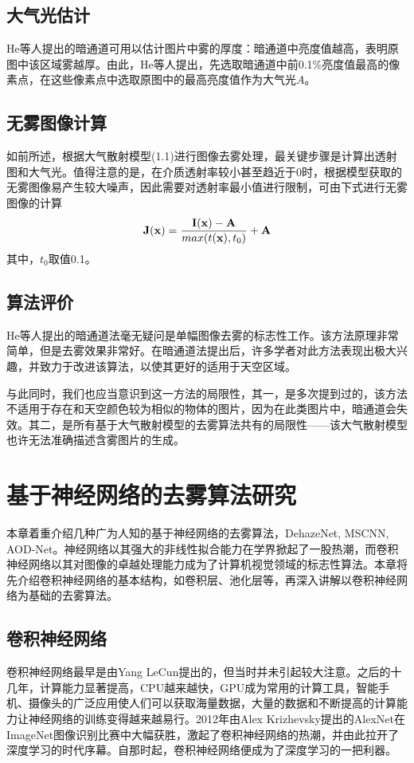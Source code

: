 \documentclass[a4paper, 12pt, oneside]{report}
\begin{document}
{\section{大气光估计\quad}
He等人提出的{\Large 暗通道可用以估计图片中雾的厚度}：暗通道中亮度值越高，表明原图中该区域雾越厚。由此，He等人提出，先选取暗通道中前0.1\%亮度值最高的像素点，在这些像素点中选取原图中的最高亮度值作为大气光$A$。

\section{无雾图像计算\quad}
如前所述，根据大气散射模型(1.1)进行图像去雾处理，最关键步骤是计算出透射图和大气光。值得注意的是，在介质透射率较小甚至趋近于0时，根据模型获取的无雾图像易产生较大噪声，因此需要对透射率最小值进行限制，可由下式进行无雾图像的计算
\begin{equation}
{\bf J(x)} = \frac{\bf I(x) - A}{max(t({\bf x}), t_0)} + {\bf A}
\end{equation}
其中，$t_0$取值0.1。

\section{算法评价\quad}
He等人提出的暗通道法毫无疑问是单幅图像去雾的标志性工作。该方法原理非常简单，但是去雾效果非常好。在暗通道法提出后，许多学者对此方法表现出极大兴趣，并致力于改进该算法，以使其更好的适用于天空区域。

与此同时，我们也应当意识到这一方法的局限性，其一，是多次提到过的，该方法不适用于存在和天空颜色较为相似的物体的图片，因为在此类图片中，暗通道会失效。其二，是所有基于大气散射模型的去雾算法共有的局限性——该大气散射模型也许无法准确描述含雾图片的生成。

\chapter{基于神经网络的去雾算法研究\quad}
本章着重介绍几种广为人知的基于神经网络的去雾算法，DehazeNet, MSCNN, AOD-Net。神经网络以其强大的非线性拟合能力在学界掀起了一股热潮，而卷积神经网络以其对图像的卓越处理能力成为了计算机视觉领域的标志性算法。本章将先介绍卷积神经网络的基本结构，如卷积层、池化层等，再深入讲解以卷积神经网络为基础的去雾算法。

\section{卷积神经网络\quad}
卷积神经网络最早是由Yang LeCun提出的，但当时并未引起较大注意。之后的十几年，计算能力显著提高，CPU越来越快，GPU成为常用的计算工具，智能手机、摄像头的广泛应用使人们可以获取海量数据，大量的数据和不断提高的计算能力让神经网络的训练变得越来越易行。2012年由Alex Krizhevsky提出的AlexNet在ImageNet图像识别比赛中大幅获胜，激起了卷积神经网络的热潮，并由此拉开了深度学习的时代序幕。自那时起，卷积神经网络便成为了深度学习的一把利器。

}
\end{document}

